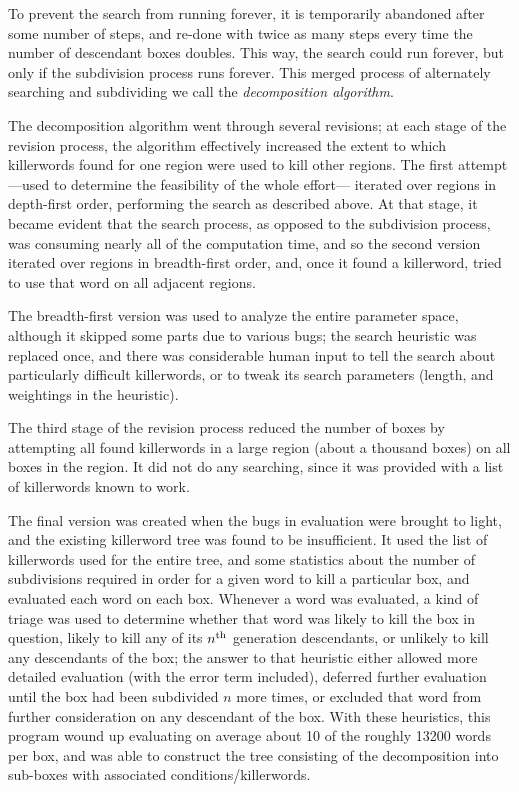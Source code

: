 To prevent the search from running forever, it is 
temporarily abandoned after some number of steps, and re-done 
with twice as many steps every time the number of descendant boxes 
doubles.  This way, the search could run forever, but only if
the subdivision process runs forever. 
This merged process of alternately searching and subdividing we
call the {\it decomposition algorithm}.

The decomposition algorithm went through several revisions; at each stage
of the revision process, 
the algorithm effectively increased the extent to which killerwords 
found for one region were used to kill other regions.  The first 
attempt---used to determine the feasibility of the whole effort--- 
iterated over regions in depth-first order, performing the search as 
described above.
At that stage, it became evident that the search process, as 
opposed to the subdivision process, 
was consuming nearly all of the computation time, and so the second 
version iterated over regions in breadth-first order, and, once it 
found a killerword, tried to use that word on all adjacent regions.

The breadth-first version was used to analyze the entire parameter 
space, although it skipped some parts due to various bugs; the search 
heuristic was replaced once, and there was considerable human input 
to tell the search about particularly difficult killerwords, or to tweak 
its search parameters (length, and weightings in the heuristic).

The third stage of the revision process reduced the number of boxes by attempting all found 
killerwords in a large region (about a thousand boxes) on all boxes 
in the region.  It did not  do any searching, since it was provided with a 
list of killerwords known to work.

The final version was created when the bugs in evaluation were 
brought to light, and the existing killerword tree was found to be insufficient.  
It used the list of killerwords used for the entire tree, and some 
statistics about the number of subdivisions required in order for a 
given word to kill a particular box, and evaluated each word on each box.  Whenever 
a word was evaluated, a kind of triage was used to determine 
whether that word was likely to kill the box in question, likely to kill 
any of its $n^{\rm th}$ generation descendants, or unlikely to kill any 
descendants of the box; the answer to that heuristic either allowed more 
detailed evaluation (with the error term included), deferred further 
evaluation until the box had been subdivided $n$ more times, or 
excluded that word from further consideration on any descendant of 
the box.  With these heuristics, this program wound up evaluating on 
average about 10 of the roughly 13200 words per box, and was able to 
construct the tree consisting of the decomposition into sub-boxes with associated conditions/killerwords.

